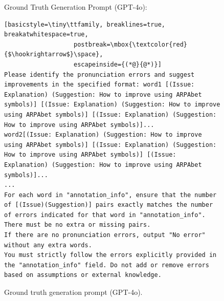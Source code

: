 \documentclass[11pt]{article}
\begin{document}
\begin{figure}[ht]
\begin{AIBox}{Ground Truth Generation Prompt (GPT-4o):}
\begin{minipage}[t]{\textwidth}
\begin{RaggedRight}
\begin{lstlisting}[basicstyle=\tiny\ttfamily, breaklines=true, breakatwhitespace=true,
                   postbreak=\mbox{\textcolor{red}{$\hookrightarrow$}\space},
                   escapeinside={(*@}{@*)}]
Please identify the pronunciation errors and suggest improvements in the specified format: word1 [(Issue: Explanation) (Suggestion: How to improve using ARPAbet symbols)] [(Issue: Explanation) (Suggestion: How to improve using ARPAbet symbols)] [(Issue: Explanation) (Suggestion: How to improve using ARPAbet symbols)]...
word2[(Issue: Explanation) (Suggestion: How to improve using ARPAbet symbols)] [(Issue: Explanation) (Suggestion: How to improve using ARPAbet symbols)] [(Issue: Explanation) (Suggestion: How to improve using ARPAbet symbols)]...
...
For each word in "annotation_info", ensure that the number of [(Issue)(Suggestion)] pairs exactly matches the number of errors indicated for that word in "annotation_info". There must be no extra or missing pairs. 
If there are no pronunciation errors, output "No error" without any extra words.
You must strictly follow the errors explicitly provided in the "annotation_info" field. Do not add or remove errors based on assumptions or external knowledge.
\end{lstlisting}
\end{RaggedRight}
\end{minipage}

\end{AIBox}
\caption{Ground truth generation prompt (GPT-4o).}
\label{fig:ground_truth_generation_prompt}
\end{figure}
\end{document}
